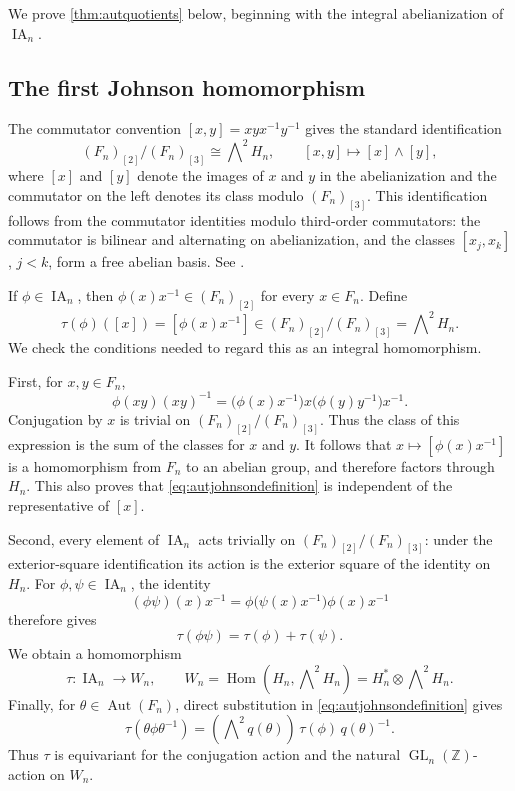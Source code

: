 \documentclass[11pt,a4paper]{article}
\theoremstyle{definition}
\newcommand{\Z}{\mathbb Z}
\newcommand{\GL}{\operatorname{GL}}
\newcommand{\Aut}{\operatorname{Aut}}
\newcommand{\Hom}{\operatorname{Hom}}
\begin{document}
We prove \cref{thm:autquotients} below, beginning with the integral
abelianization of \(\operatorname{IA}_n\).

\subsection{The first Johnson homomorphism}

The commutator convention \([x,y]=xyx^{-1}y^{-1}\) gives the
standard identification
\[
 (F_n)_{[2]}/(F_n)_{[3]}
   \cong\bigwedge\nolimits^2H_n,
 \qquad [x,y]\longmapsto[x]\wedge[y],
\]
where \([x]\) and \([y]\) denote the images of \(x\) and \(y\) in the abelianization and the commutator on the left denotes its class modulo
\((F_n)_{[3]}\). This identification follows from the
commutator identities modulo third-order commutators: the
commutator is bilinear and alternating on abelianization, and
the classes \([x_j,x_k]\), \(j<k\), form a free abelian basis.
See \cite[Sections~3 and~4.1]{SatohSurvey}.

If \(\phi\in\operatorname{IA}_n\), then
\(\phi(x)x^{-1}\in(F_n)_{[2]}\) for every \(x\in F_n\).
Define
\begin{equation}\label{eq:autjohnsondefinition}
 \tau(\phi)([x])
   =[\phi(x)x^{-1}]
   \in(F_n)_{[2]}/(F_n)_{[3]}
   =\bigwedge\nolimits^2H_n.
\end{equation}
We check the conditions needed to regard this as an integral
homomorphism.

First, for \(x,y\in F_n\),
\[
 \phi(xy)(xy)^{-1}
 =\bigl(\phi(x)x^{-1}\bigr)
    x\bigl(\phi(y)y^{-1}\bigr)x^{-1}.
\]
Conjugation by \(x\) is trivial on
\((F_n)_{[2]}/(F_n)_{[3]}\). Thus the class of this expression
is the sum of the classes for \(x\) and \(y\). It follows that
\(x\mapsto[\phi(x)x^{-1}]\) is a homomorphism from \(F_n\)
to an abelian group, and therefore factors through \(H_n\).
This also proves that \eqref{eq:autjohnsondefinition} is
independent of the representative of \([x]\).

Second, every element of \(\operatorname{IA}_n\) acts trivially
on \((F_n)_{[2]}/(F_n)_{[3]}\): under the exterior-square
identification its action is the exterior square of the identity
on \(H_n\). For \(\phi,\psi\in\operatorname{IA}_n\), the
identity
\[
 (\phi\psi)(x)x^{-1}
   =\phi\bigl(\psi(x)x^{-1}\bigr)
      \phi(x)x^{-1}
\]
therefore gives \[\tau(\phi\psi)=\tau(\phi)+\tau(\psi).\]
We obtain a homomorphism
\[
 \tau:\operatorname{IA}_n\longrightarrow W_n,
 \qquad
 W_n=\Hom\left(H_n,\bigwedge\nolimits^2H_n\right)
     =H_n^*\otimes\bigwedge\nolimits^2H_n.
\]
Finally, for \(\theta\in\Aut(F_n)\), direct substitution in
\eqref{eq:autjohnsondefinition} gives
\begin{equation}\label{eq:autjohnsonequivariance}
 \tau(\theta\phi\theta^{-1})
    =\left(\bigwedge\nolimits^2q(\theta)\right)\,
        \tau(\phi)\,q(\theta)^{-1}.
\end{equation}
Thus \(\tau\) is equivariant for the conjugation action and
the natural \(\GL_n(\Z)\)-action on \(W_n\).
\end{document}
